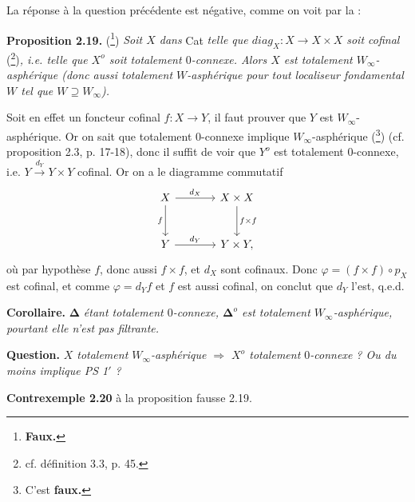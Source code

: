 La réponse à la question précédente est négative, comme on voit par la :


\noindent\textbf{Proposition 2.19.} (\footnote[43]{\textbf{Faux.}}) \textit{Soit $X$ dans} Cat \textit{telle que $\mathit{diag}_X : X \longrightarrow X \times X$ soit cofinal} (\footnote[44]{cf. définition 3.3, p. 45.})\textit{, i.e. telle que $X^o$ soit totalement $0$-connexe. Alors $X$ est totalement $W_\infty$-asphérique (donc aussi totalement $W$-asphérique pour tout localiseur fondamental $W$ tel que $W \supseteq W_\infty$).}

Soit en effet un foncteur cofinal $f : X \longrightarrow Y$, il faut prouver que $Y$ est $W_\infty$-asphérique. Or on sait que totalement 0-connexe implique $W_\infty$-asphérique (\footnote[45]{C'est \textbf{faux.}}) (cf. proposition 2.3, p. 17-18), donc il suffit de voir que $Y^o$ est totalement 0-connexe, i.e. $Y \xrightarrow{d_Y} Y \times Y$ cofinal. Or on a le diagramme commutatif
\[
\begin{tikzcd}[row sep=large, column sep=large]
X \arrow[r, "d_X"] \arrow[d, "f"'] & X \times X \arrow[d, "f \times f"] \\
Y \arrow[r, "d_Y"] & Y \times Y,
\end{tikzcd}
\]
où par hypothèse $f$, donc aussi $f \times f$, et $d_X$ sont cofinaux. Donc $\varphi = (f \times f) \circ p_X$ est cofinal, et comme $\varphi = d_Y f$ et $f$ est aussi cofinal, on conclut que $d_Y$ l'est, q.e.d.

\noindent\textbf{Corollaire.} $\boldsymbol{\Delta}$ \textit{étant totalement $0$-connexe, $\boldsymbol{\Delta}^o$ est totalement $W_\infty$-asphérique, pourtant elle n'est pas filtrante.}

\noindent\textbf{Question.} \textit{$X$ totalement $W_\infty$-asphérique $\Longrightarrow$ $X^o$ totalement $0$-connexe ? Ou du moins implique PS 1$'$ ?}

\noindent\textbf{Contrexemple 2.20} à la proposition fausse 2.19.

